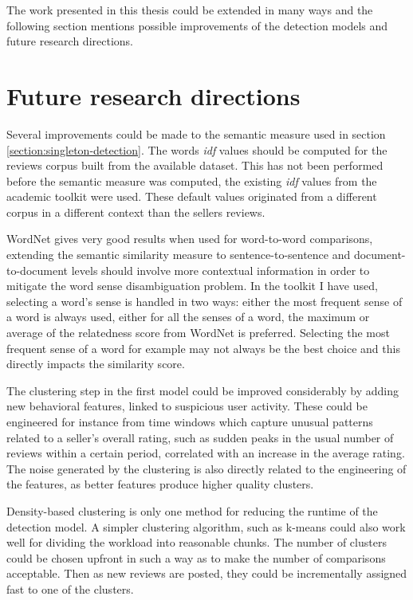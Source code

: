 The work presented in this thesis could be extended in many ways and the following section mentions possible improvements of the detection models and future research directions.

\section{Future research directions}

Several improvements could be made to the semantic measure used in section \ref{section:singleton-detection}. The words \textit{idf} values should be computed for the reviews corpus built from the available dataset. This has not been performed before the semantic measure was computed, the existing \textit{idf} values from the academic toolkit were used. These default values originated from a different corpus in a different context than the sellers reviews. 

WordNet gives very good results when used for word-to-word comparisons, extending the semantic similarity measure to sentence-to-sentence and document-to-document levels should involve more contextual information in order to mitigate the word sense disambiguation problem. In the toolkit I have used, selecting a word's sense is handled in two ways: either the most frequent sense of a word is always used, either for all the senses of a word, the maximum or average of the relatedness score from WordNet is preferred. Selecting the most frequent sense of a word for example may not always be the best choice and this directly impacts the similarity score. 

The clustering step in the first model could be improved considerably by adding new behavioral features, linked to suspicious user activity. These could be engineered for instance from time windows which capture unusual patterns related to a seller's overall rating, such as sudden peaks in the usual number of reviews within a certain period, correlated with an increase in the average rating. The noise generated by the clustering is also directly related to the engineering of the features, as better features produce higher quality clusters. 

Density-based clustering is only one method for reducing the runtime of the detection model. A simpler clustering algorithm, such as k-means could also work well for dividing the workload into reasonable chunks. The number of clusters could be chosen upfront in such a way as to make the number of comparisons acceptable. Then as new reviews are posted, they could be incrementally assigned fast to one of the clusters.  

